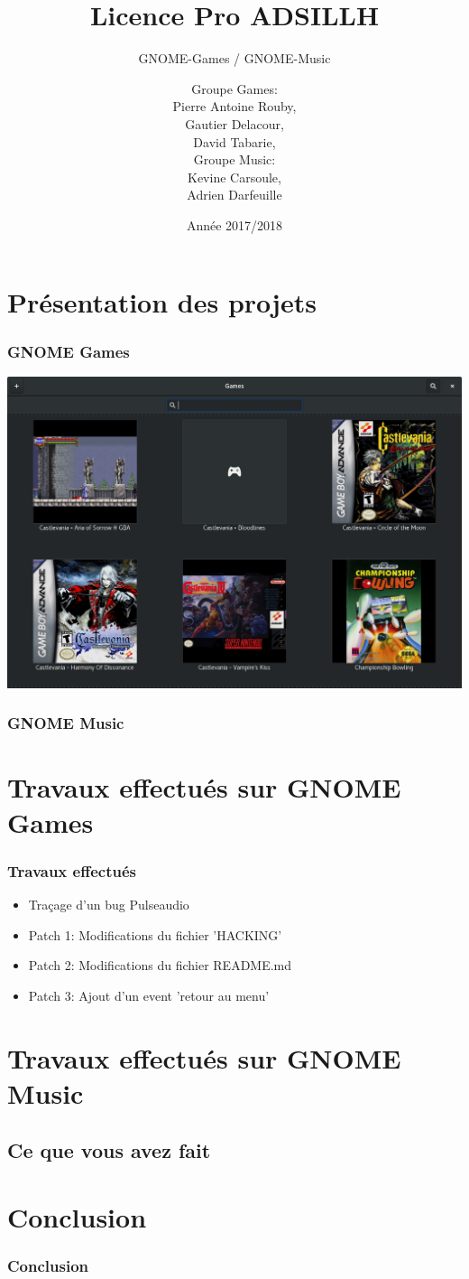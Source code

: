\documentclass{beamer}
\title{Licence Pro ADSILLH}
\subtitle{GNOME-Games / GNOME-Music}
\author{Groupe Games:\\ Pierre Antoine Rouby,\\ Gautier Delacour,\\
  David Tabarie,\\
  \vspace{0.8cm}
  Groupe Music:\\ Kevine Carsoule,\\ Adrien Darfeuille}
\date{Année 2017/2018}
\begin{document}
\frame{\titlepage}

\section{Présentation des projets}

\begin{frame}
  \frametitle{GNOME Games}
  \includegraphics[scale=0.3]{images/screen-games.png}
\end{frame}

\begin{frame}
  \frametitle{GNOME Music}
\end{frame}

\section{Travaux effectués sur GNOME Games}
\begin{frame}
  \frametitle{Travaux effectués}
  \begin{itemize}
    \item Traçage d'un bug Pulseaudio
    \item Patch 1: Modifications du fichier 'HACKING'
    \item Patch 2: Modifications du fichier README.md
    \item Patch 3: Ajout d'un event 'retour au menu'
  \end{itemize}
\end{frame}

\section{Travaux effectués sur GNOME Music}
\subsection{Ce que vous avez fait}
\begin{frame}
  \frametitle{}
\end{frame}

\section{Conclusion}
\begin{frame}
  \frametitle{Conclusion}
\end{frame}
\end{document}
